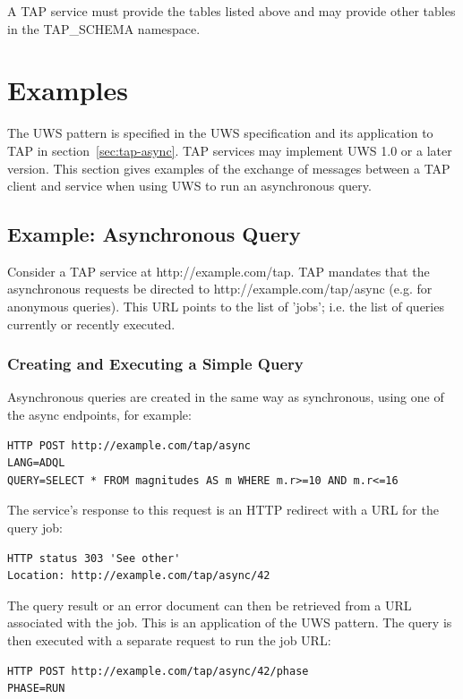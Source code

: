 \documentclass[11pt,letter]{ivoa}
\newcommand{\tapschema}{TAP\_SCHEMA}
\newcommand{\tapschema}{\mbox{%
  \relsize{-0.5}TAP\discretionary{-}{}{\kern-2pt\_}SCHEMA}}
\begin{document}
A TAP service must provide the tables listed above and may provide other tables 
in the \tapschema{} namespace.


\section{Examples}
\label{sec:examples}

The UWS pattern is specified in the UWS specification \citep{std:UWS} and its application to TAP in 
section~\ref{sec:tap-async}. TAP services may implement UWS 1.0
or a later version. 
This section gives examples of the exchange of messages between a 
TAP client and service when using UWS to run an asynchronous query.

\subsection{Example: Asynchronous Query}
Consider a TAP service at http://example.com/tap. TAP mandates that the 
asynchronous requests be directed to http://example.com/tap/async (e.g. for 
anonymous queries). This URL points to the list of 'jobs'; i.e. the list of 
queries currently or recently executed.

\subsubsection{Creating and Executing a Simple Query}

Asynchronous queries are created in the same way as synchronous, using 
one of the {async} endpoints, for example:

\begin{verbatim}
HTTP POST http://example.com/tap/async
LANG=ADQL
QUERY=SELECT * FROM magnitudes AS m WHERE m.r>=10 AND m.r<=16
\end{verbatim}

The service's response to this request is an HTTP redirect with a URL for the 
query job:

\begin{verbatim}
HTTP status 303 'See other'
Location: http://example.com/tap/async/42
\end{verbatim}

The query result or an error document can then be retrieved from a URL 
associated with the job. This is an application of the UWS pattern. The query is 
then executed with a separate request to run the job URL:

\begin{verbatim}
HTTP POST http://example.com/tap/async/42/phase
PHASE=RUN
\end{verbatim}
\end{document}
